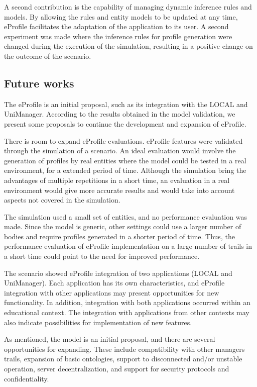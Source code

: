 \documentclass{svjour3}                     %
\begin{document}
A second contribution is the capability of managing dynamic inference rules and models. By allowing the rules and entity models to be updated at any time, eProfile facilitates the adaptation of the application to its user. A second experiment was made where the inference rules for profile generation were changed during the execution of the simulation, resulting in a positive change on the outcome of the scenario.

\subsection{Future works}

The eProfile is an initial proposal, such as its integration with the LOCAL and UniManager. According to the results obtained in the model validation, we present some proposals to continue the development and expansion of eProfile.

There is room to expand eProfile evaluations. eProfile features were validated through the simulation of a scenario. An ideal evaluation would involve the generation of profiles by real entities where the model could be tested in a real environment, for a extended period of time. Although the simulation bring the advantages of multiple repetitions in a short time, an evaluation in a real environment would give more accurate results and would take into account aspects not covered in the simulation.

The simulation used a small set of entities, and no performance evaluation was made. Since the model is generic, other settings could use a larger number of bodies and require profiles generated in a shorter period of time. Thus, the performance evaluation of eProfile implementation on a large number of trails in a short time could point to the need for improved performance.

The scenario showed eProfile integration of two applications (LOCAL and UniManager). Each application has its own characteristics, and eProfile integration with other applications may present opportunities for new functionality. In addition, integration with both applications occurred within an educational context. The integration with applications from other contexts may also indicate possibilities for implementation of new features.

As mentioned, the model is an initial proposal, and there are several opportunities for expanding. These include compatibility with other managers trails, expansion of basic ontologies, support to disconnected and/or unstable operation, server decentralization, and support for security protocols and confidentiality.





%
%
%

\end{document}
